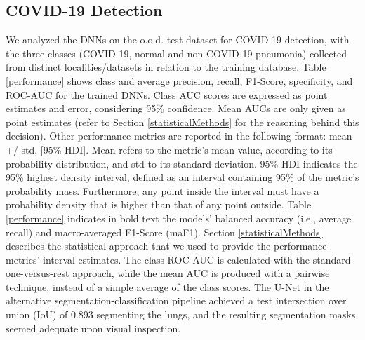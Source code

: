 \documentclass[fleqn,10pt]{wlscirep}
\begin{document}
{\subsection{COVID-19 Detection}
\label{covidResults}
We analyzed the DNNs on the o.o.d. test dataset for COVID-19 detection, with the three classes (COVID-19, normal and non-COVID-19 pneumonia) collected from distinct localities/datasets in relation to the training database. Table \ref{performance} shows class and average precision, recall, F1-Score, specificity, and ROC-AUC for the trained DNNs. Class AUC scores are expressed as point estimates and error, considering 95\% confidence. Mean AUCs are only given as point estimates (refer to Section \ref{statisticalMethods} for the reasoning behind this decision). Other performance metrics are reported in the following format: mean +/-std, [95\% HDI]. Mean refers to the metric's mean value, according to its probability distribution, and std to its standard deviation. 95\% HDI indicates the 95\% highest density interval, defined as an interval containing 95\% of the metric's probability mass. Furthermore, any point inside the interval must have a probability density that is higher than that of any point outside. Table \ref{performance} indicates in bold text the models' balanced accuracy (i.e., average recall) and macro-averaged F1-Score (maF1). Section \ref{statisticalMethods} describes the statistical approach that we used to provide the performance metrics' interval estimates. The class ROC-AUC is calculated with the standard one-versus-rest approach, while the mean AUC is produced with a pairwise technique\cite{MulticlassAUC}, instead of a simple average of the class scores. The U-Net in the alternative segmentation-classification pipeline achieved a test intersection over union (IoU) of 0.893 segmenting the lungs, and the resulting segmentation masks seemed adequate upon visual inspection.


}
\end{document}
